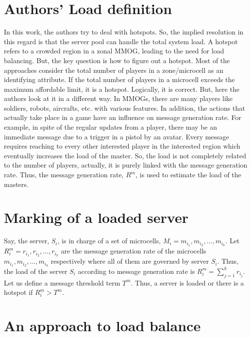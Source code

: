 \section{Authors' Load definition}

In this work, the authors try to deal with hotspots. So, the implied resolution in this regard is that the server pool can handle the total system load. A hotspot refers to a crowded region in a zonal MMOG, leading to the need for load balancing. But, the key question is how to figure out a hotspot. Most of the approaches consider the total number of players in a zone/microcell as an identifying attribute. If the total number of players in a microcell exceeds the maximum affordable limit, it is a hotspot. Logically, it is correct. But, here the authors look at it in a different way. In MMOGs, there are many players like soldiers, robots, aircrafts, etc. with various features. In addition, the actions that actually take place in a game have an influence on message generation rate. For example, in spite of the regular updates from a player, there may be an immediate message due to a trigger in a pistol by an avatar. Every message requires reaching to every other interested player in the interested region which eventually increases the load of the master. So, the load is not completely related to the number of players, actually, it is purely linked with the message generation rate. Thus, the message generation rate, $R^m$, is used to estimate the load of the masters.



\section{Marking of a loaded server}

Say, the server, $S_i$, is in charge of a set of microcells, $M_i = {m_{i_1} ,m_{i_2} , ..., m_{i_k}}$. Let $R^m_i = {r_{i_1} , r_{i_2} , ..., r_{i_k}}$ are the message generation rate of the microcells ${m_{i_1}, m_{i_2} , ..., m_{i_k}}$ respectively where all of them are governed by server $S_i$. Thus, the load of the server $S_i$ according to message generation rate is $R^m_i = \sum_{j=1}^k r_{i_j}$. Let us define a message threshold term $T^m$. Thus, a server is loaded or there is a hotspot if $R^m_i > T^m$.



\section{An approach to load balance}

